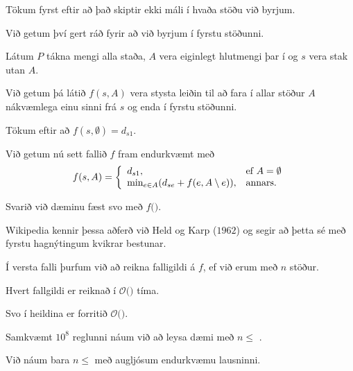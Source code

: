 {
	{
		\item<1-> Tökum fyrst eftir að það skiptir ekki máli í hvaða stöðu við byrjum.
		\item<2-> Við getum því gert ráð fyrir að við byrjum í fyrstu stöðunni.
		\item<3-> Látum $P$ tákna mengi alla staða, $A$ vera eiginlegt hlutmengi þar í og $s$ vera stak utan $A$.
		\item<4-> Við getum þá látið $f(s, A)$ vera stysta leiðin til að fara í allar stöður $A$ nákvæmlega einu sinni frá $s$ og enda í fyrstu stöðunni.
		\item<5-> Tökum eftir að $f(s, \emptyset) = d_{s1}$.
		\item<6-> Við getum nú sett fallið $f$ fram endurkvæmt með
		\[
			f(s, A) = 
			\left \{
			\env{array}
			{
				{l l}
				d_{s1}, & \text{ef $A = \emptyset$}\\
				\text{min}_{e \in A} (d_{se} + f(e, A \setminus e)), & \text{annars}.
			}
			\right .
		\]
		\item<7-> Svarið við dæminu fæst svo með $f($\onslide<8->{$1, P \setminus \{1\}$}$)$.
	}
}

{
	{
		\item<1-> Wikipedia kennir þessa aðferð við Held og Karp ($1962$) og segir að þetta sé með fyrstu hagnýtingum kvikrar bestunar.
		\item<2-> Í versta falli þurfum við að reikna  falligildi á $f$, ef við erum með $n$ stöður.
		\item<4-> Hvert fallgildi er reiknað í $\mathcal{O}($$)$ tíma.
		\item<6-> Svo í heildina er forritið $\mathcal{O}($\onslide<7->{$n^2 \cdot 2^n$}$)$.
		\item<8-> Samkvæmt $10^8$ reglunni náum við að leysa dæmi með $n \leq$ \onslide<9->{$18$}.
		\item<10-> Við náum bara $n \leq$  með augljósum endurkvæmu lausninni.
	}
}

{
}

{
}


